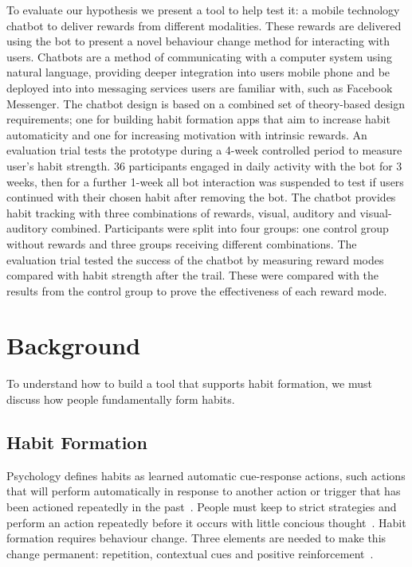 \documentclass{scaffold/sigchi}
\begin{document}
To evaluate our hypothesis we present a tool to help test it: a mobile technology chatbot to deliver rewards from different modalities.
These rewards are delivered using the bot to present a novel behaviour change method for interacting with users.
Chatbots are a method of communicating with a computer system using natural language, providing deeper integration into users mobile phone and be deployed into into messaging services users are familiar with, such as Facebook Messenger.
The chatbot design is based on a combined set of theory-based design requirements;
one for building habit formation apps that aim to increase habit automaticity and one for increasing motivation with intrinsic rewards.\newline
\newline
An evaluation trial tests the prototype during a 4-week controlled period to measure user's habit strength.
36 participants engaged in daily activity with the bot for 3 weeks, then for a further 1-week all bot interaction was suspended to test if users continued with their chosen habit after removing the bot.
The chatbot provides habit tracking with three combinations of rewards, visual, auditory and visual-auditory combined.
Participants were split into four groups: one control group without rewards and three groups receiving different combinations.
The evaluation trial tested the success of the chatbot by measuring reward modes compared with habit strength after the trail. These were compared with the results from the control group to prove the effectiveness of each reward mode.


\section{Background}
To understand how to build a tool that supports habit formation, we must discuss how people fundamentally form habits.

\subsection{Habit Formation}
Psychology defines habits as learned automatic cue-response actions, such actions that will perform automatically in response to another action or trigger that has been actioned repeatedly in the past~\cite{article_the_habitual_consumer}. People must keep to strict strategies and perform an action repeatedly before it occurs with little concious thought~\cite{article_promoting_habit_formation}. Habit formation requires behaviour change. Three elements are needed to make this change permanent: repetition, contextual cues and positive reinforcement~\cite{article_experiences_of_habit_formation}.
\end{document}
